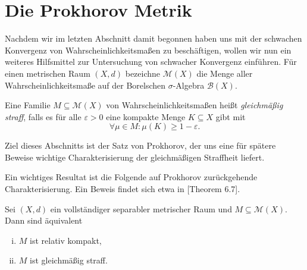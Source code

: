 \section{Die Prokhorov Metrik}
Nachdem wir im letzten Abschnitt damit begonnen haben uns mit der schwachen Konvergenz von Wahrscheinlichkeitsmaßen zu beschäftigen, 
wollen wir nun ein weiteres Hilfsmittel zur Untersuchung von schwacher Konvergenz einführen. 
\newline 
Für einen metrischen Raum $(X,d)$ bezeichne $\mathcal{M}(X)$ die Menge aller Wahrscheinlichkeitsmaße auf der Borelschen $\sigma$-Algebra $\mathcal{B}(X)$. 
\begin{mydef}
    Eine Familie $M \subseteq \mathcal{M}(X)$ von Wahrscheinlichkeitsmaßen heißt \textit{gleichmäßig straff}, 
    falls es für alle $\varepsilon > 0$ eine kompakte Menge $K \subseteq X$ gibt mit 
    $$
        \forall \mu \in M: \mu(K) \geq 1-\varepsilon. 
    $$
\end{mydef}
Ziel dieses Abschnitts ist der Satz von Prokhorov, der uns eine für spätere Beweise wichtige Charakterisierung der gleichmäßigen Straffheit liefert. 

Ein wichtiges Resultat ist die Folgende auf Prokhorov zurückgehende Charakterisierung. Ein Beweis findet sich etwa in \cite{parthasarathy}[Theorem 6.7]. 

\begin{theorem}
    Sei $(X,d)$ ein vollständiger separabler metrischer Raum und $M \subseteq \mathcal{M}(X)$. Dann sind äquivalent
    \begin{enumerate}[(i)]
        \item $M$ ist relativ kompakt,
        \item $M$ ist gleichmäßig straff. 
    \end{enumerate}
\end{theorem}